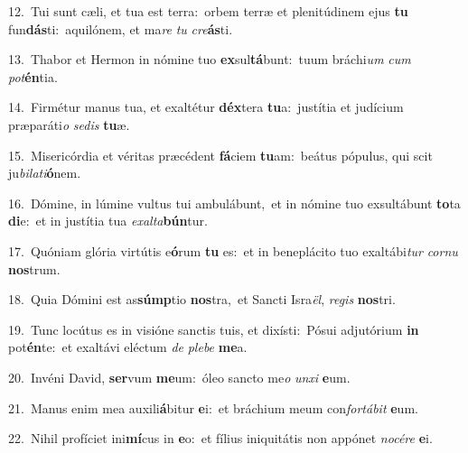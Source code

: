 {\numbfont\textcolor{\numbcolor}{12.}}~Tui sunt cæli, et tua est terra:~\dagger orbem terræ et plenitúdinem ejus \textbf{tu} fun\-\textbf{dás}\-ti:~\star aquilónem, et ma\textit{re} \textit{tu} \textit{cre}\-\textbf{ás}ti.\par
{\numbfont\textcolor{\numbcolor}{13.}}~Thabor et Hermon in nómine tuo \textbf{ex}\-sul\-\textbf{tá}\-bunt:~\star tuum bráchi\textit{um} \textit{cum} \textit{pot}\-\textbf{én}tia.\par
{\numbfont\textcolor{\numbcolor}{14.}}~Firmétur manus tua, et exaltétur \textbf{déx}\-tera \textbf{tu}\-a:~\star justítia et judícium præparáti\textit{o} \textit{se}\-\textit{dis} \textbf{tu}\-æ.\par
{\numbfont\textcolor{\numbcolor}{15.}}~Misericórdia et véritas præcédent \textbf{fá}\-ciem \textbf{tu}\-am:~\star beátus pópulus, qui scit ju\-\textit{bi}\-\textit{la}\textit{ti}\textbf{ó}nem.\par
{\numbfont\textcolor{\numbcolor}{16.}}~Dómine, in lúmine vultus tui ambulábunt,~\dagger et in nómine tuo exsultábunt \textbf{to}\-ta \textbf{di}\-e:~\star et in justítia tua \textit{ex}\-\textit{al}\textit{ta}\textbf{bún}tur.\par
{\numbfont\textcolor{\numbcolor}{17.}}~Quóniam glória virtútis e\-\textbf{ó}\-rum \textbf{tu} es:~\star et in beneplácito tuo exaltábi\textit{tur} \textit{cor}\-\textit{nu} \textbf{nos}\-trum.\par
{\numbfont\textcolor{\numbcolor}{18.}}~Quia Dómini est as\-\textbf{súmp}\-tio \textbf{nos}\-tra,~\star et Sancti Isra\-\textit{ël}\-, \textit{re}\-\textit{gis} \textbf{nos}\-tri.\par
{\numbfont\textcolor{\numbcolor}{19.}}~Tunc locútus es in visióne sanctis tuis, et dixísti:~\dagger Pósui adjutórium \textbf{in} pot\-\textbf{én}\-te:~\star et exaltávi eléctum \textit{de} \textit{ple}\-\textit{be} \textbf{me}\-a.\par
{\numbfont\textcolor{\numbcolor}{20.}}~Invéni David, \textbf{ser}\-vum \textbf{me}\-um:~\star óleo sancto me\textit{o} \textit{un}\-\textit{xi} \textbf{e}\-um.\par
{\numbfont\textcolor{\numbcolor}{21.}}~Manus enim mea auxili\-\textbf{á}\-bitur \textbf{e}\-i:~\star et bráchium meum con\-\textit{for}\-\textit{tá}\textit{bit} \textbf{e}\-um.\par
{\numbfont\textcolor{\numbcolor}{22.}}~Nihil profíciet ini\-\textbf{mí}\-cus in \textbf{e}\-o:~\star et fílius iniquitátis non appónet \textit{no}\-\textit{cé}\textit{re} \textbf{e}\-i.\par

